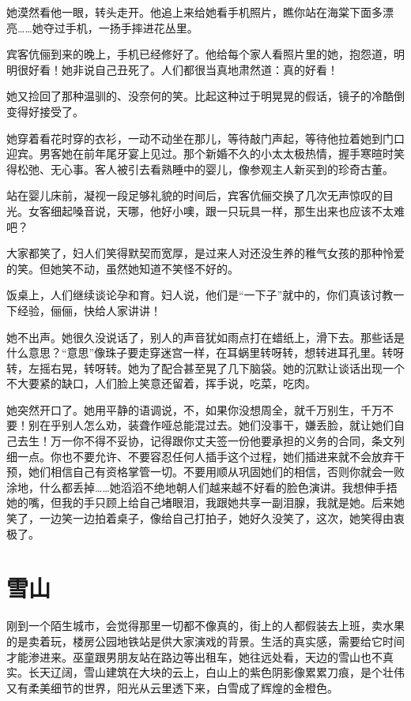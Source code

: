 \documentclass[lang=cn,newtx,12pt,scheme=chinese]{elegantbook}
\begin{document}
她漠然看他一眼，转头走开。他追上来给她看手机照片，瞧你站在海棠下面多漂亮……她夺过手机，一扬手摔进花丛里。

宾客伉俪到来的晚上，手机已经修好了。他给每个家人看照片里的她，抱怨道，明明很好看！她非说自己丑死了。人们都很当真地肃然道：真的好看！

她又捡回了那种温驯的、没奈何的笑。比起这种过于明晃晃的假话，镜子的冷酷倒变得好接受了。

她穿着看花时穿的衣衫，一动不动坐在那儿，等待敲门声起，等待他拉着她到门口迎宾。男客她在前年尾牙宴上见过。那个新婚不久的小太太极热情，握手寒暄时笑得松弛、无心事。客人被引去看熟睡中的婴儿，像参观主人新买到的珍奇古董。

站在婴儿床前，凝视一段足够礼貌的时间后，宾客伉俪交换了几次无声惊叹的目光。女客细起嗓音说，天哪，他好小噢，跟一只玩具一样，那生出来也应该不太难吧？

大家都笑了，妇人们笑得默契而宽厚，是过来人对还没生养的稚气女孩的那种怜爱的笑。但她笑不动，虽然她知道不笑怪不好的。

饭桌上，人们继续谈论孕和育。妇人说，他们是“一下子”就中的，你们真该讨教一下经验，俪俪，快给人家讲讲！

她不出声。她很久没说话了，别人的声音犹如雨点打在蜡纸上，滑下去。那些话是什么意思？“意思”像珠子要走穿迷宫一样，在耳蜗里转呀转，想转进耳孔里。转呀转，左摇右晃，转呀转。她为了配合甚至晃了几下脑袋。她的沉默让谈话出现一个不大要紧的缺口，人们脸上笑意还留着，挥手说，吃菜，吃肉。

她突然开口了。她用平静的语调说，不，如果你没想周全，就千万别生，千万不要！别在乎别人怎么劝，装聋作哑总能混过去。她们没事干，嫌丢脸，就让她们自己去生！万一你不得不妥协，记得跟你丈夫签一份他要承担的义务的合同，条文列细一点。你也不要允许、不要容忍任何人插手这个过程，她们插进来就不会放弃干预，她们相信自己有资格掌管一切。不要用顺从巩固她们的相信，否则你就会一败涂地，什么都丢掉……她滔滔不绝地朝人们越来越不好看的脸色演讲。我想伸手捂她的嘴，但我的手只顾上给自己堵眼泪，我跟她共享一副泪腺，我就是她。后来她笑了，一边笑一边拍着桌子，像给自己打拍子，她好久没笑了，这次，她笑得由衷极了。
\chapter{雪山}
刚到一个陌生城市，会觉得那里一切都不像真的，街上的人都假装去上班，卖水果的是卖着玩，楼房公园地铁站是供大家演戏的背景。生活的真实感，需要给它时间才能渗进来。巫童跟男朋友站在路边等出租车，她往远处看，天边的雪山也不真实。长天辽阔，雪山建筑在大块的云上，白山上的紫色阴影像累累刀痕，是个壮伟又有柔美细节的世界，阳光从云里透下来，白雪成了辉煌的金橙色。
\end{document}
